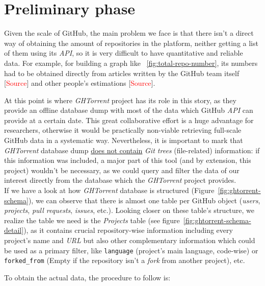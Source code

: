 \documentclass[a4paper, 12pt]{book}
\begin{document}
\section{Preliminary phase}
\label{sec:preliminary-phase}
Given the scale of GitHub, the main problem we face is that there isn't a direct way
of obtaining the amount of repositories in the platform, neither getting a list of them using its \textit{API}, so it is
very difficult to have quantitative and reliable data. For example, for building a graph like ~\ref{fig:total-repo-number},
its numbers had to be obtained directly from articles written by the GitHub team itself [\textcolor{red}{Source}]
and other people's estimations [\textcolor{red}{Source}].\par
At this point is where \emph{GHTorrent} project has its role in this story, as they provide an offline database dump with most
of the data which GitHub \textit{API} can provide at a certain date. This great collaborative effort is a huge advantage
for researchers, otherwise it would be practically non-viable retrieving full-scale GitHub data in a systematic way.
Nevertheless, it is important to mark that \emph{GHTorrent} database dump \underline{does not contain} \textit{Git trees}
(file-related) information: if this information was included, a major part of this tool (and by extension, this project) wouldn't
be necessary, as we could query and filter the data of our interest directly from the database which the \emph{GHTorrent} project provides.\\
If we have a look at how \emph{GHTorrent} database is structured (Figure~\ref{fig:ghtorrent-schema}), we can observe that
there is almost one table per GitHub object (\textit{users}, \textit{projects}, \textit{pull requests}, \textit{issues}, etc.).
Looking closer on these table's structure, we realize the table we need is the \emph{Projects} table
(see figure~\ref{fig:ghtorrent-schema-detail}), as it contains crucial repository-wise information including every project's name
and \textit{URL} but also other complementary information which could be used as a primary filter, like \texttt{language} (project's main language,
code-wise) or \texttt{forked\_from} (Empty if the repository isn't a \textit{fork} from another project), etc.\par
To obtain the actual data, the procedure to follow is:
\end{document}
